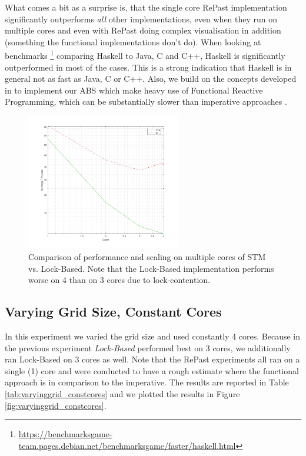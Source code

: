 What comes a bit as a surprise is, that the single core RePast implementation significantly outperforms \textit{all} other implementations, even when they run on multiple cores and even with RePast doing complex visualisation in addition (something the functional implementations don't do). When looking at benchmarks \footnote{\url{https://benchmarksgame-team.pages.debian.net/benchmarksgame/faster/haskell.html}} comparing Haskell to Java, C and C++, Haskell is significantly outperformed in most of the cases. This is a strong indication that Haskell is in general not as fast as Java, C or C++. %
Also, we build on the concepts developed in \cite{thaler_pure_2019} to implement our ABS which make heavy use of Functional Reactive Programming, which can be substantially slower than imperative approaches \cite{nilsson_functional_2002, hudak_arrows_2003}. 

\begin{figure}
	\centering
	\includegraphics[width=0.6\textwidth, angle=0]{./fig/sir/core_duration_stm_io.png}
	\caption{Comparison of performance and scaling on multiple cores of STM vs. Lock-Based. Note that the Lock-Based implementation performs worse on 4 than on 3 cores due to lock-contention.}
	\label{fig:core_duration_stm_io}
\end{figure}

\subsection{Varying Grid Size, Constant Cores}
In this experiment we varied the grid size and used constantly 4 cores. Because in the previous experiment \textit{Lock-Based} performed best on 3 cores, we additionally ran Lock-Based on 3 cores as well. Note that the RePast experiments all ran on a single (1) core and were conducted to have a rough estimate where the functional approach is in comparison to the imperative. The results are reported in Table \ref{tab:varyinggrid_constcores} and we plotted the results in Figure \ref{fig:varyinggrid_constcores}.

